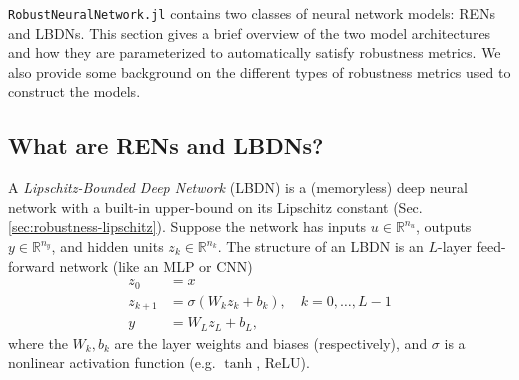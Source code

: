 \verb|RobustNeuralNetwork.jl| contains two classes of neural network models: RENs and LBDNs. This section gives a brief overview of the two model architectures and how they are parameterized to automatically satisfy robustness metrics. We also provide some background on the different types of robustness metrics used to construct the models.

\subsection{What are RENs and LBDNs?} \label{sec:model-structures}

A \textit{Lipschitz-Bounded Deep Network} (LBDN) is a (memoryless) deep neural network with a built-in upper-bound on its Lipschitz constant (Sec. \ref{sec:robustness-lipschitz}). Suppose the network has inputs $u \in\mathbb{R}^{n_u}$, outputs $y \in \mathbb{R}^{n_y}$, and hidden units $z_k \in \mathbb{R}^{n_k}$. The structure of an LBDN is an $L$-layer feed-forward network (like an MLP or CNN)
\begin{align} 
z_0 &= x \label{eqn:lbdn-z0}\\
z_{k+1} &= \sigma(W_k z_k + b_k), \quad k = 0, \ldots, L-1 \label{eqn:lbdn-sandwich}\\
y &= W_L z_L + b_L, \label{eqn:lbdn-output}
\end{align}
where the $W_k, b_k$ are the layer weights and biases (respectively), and $\sigma$ is a nonlinear activation function (e.g. $\tanh$, ReLU).

